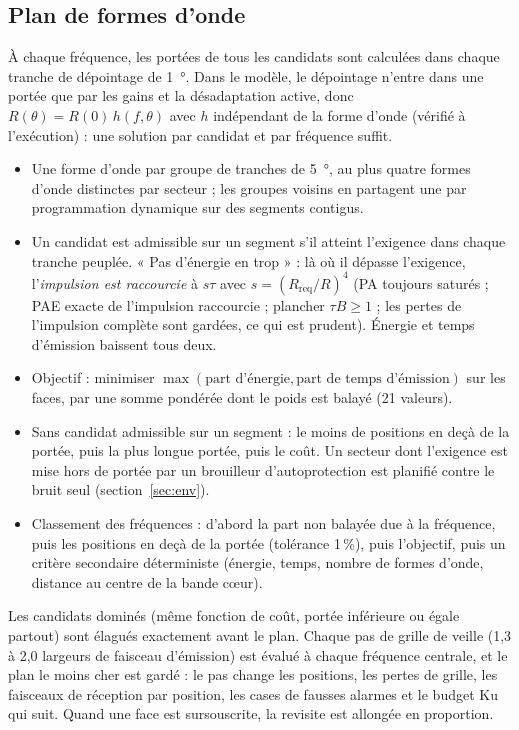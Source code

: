\documentclass[11pt,a4paper]{article}
\begin{document}
\subsection{Plan de formes d'onde}
À chaque fréquence, les portées de tous les candidats sont calculées dans chaque tranche de dépointage de
\SI{1}{\degree}. Dans le modèle, le dépointage n'entre dans une portée que par les gains et la désadaptation active,
donc $R(\theta) = R(0)\,h(f,\theta)$ avec $h$ indépendant de la forme d'onde (vérifié à l'exécution) : une solution par
candidat et par fréquence suffit.
\begin{itemize}
  \item Une forme d'onde par groupe de tranches de \SI{5}{\degree}, au plus quatre formes d'onde distinctes par
        secteur ; les groupes voisins en partagent une par programmation dynamique sur des segments contigus.
  \item Un candidat est admissible sur un segment s'il atteint l'exigence dans chaque tranche peuplée. « Pas
        d'énergie en trop » : là où il dépasse l'exigence, l'\emph{impulsion est raccourcie} à $s\tau$ avec
        $s = (R_{\mathrm{req}}/R)^4$ (PA toujours saturés ; PAE exacte de l'impulsion raccourcie ; plancher
        $\tau B \ge 1$ ; les pertes de l'impulsion complète sont gardées, ce qui est prudent). Énergie et temps
        d'émission baissent tous deux.
  \item Objectif : minimiser $\max(\text{part d'énergie}, \text{part de temps d'émission})$ sur les faces, par une
        somme pondérée dont le poids est balayé (21 valeurs).
  \item Sans candidat admissible sur un segment : le moins de positions en deçà de la portée, puis la plus longue
        portée, puis le coût. Un secteur dont l'exigence est mise hors de portée par un brouilleur d'autoprotection est
        planifié contre le bruit seul (section~\ref{sec:env}).
  \item Classement des fréquences : d'abord la part non balayée due à la fréquence, puis les positions en deçà de la
        portée (tolérance 1\,\%), puis l'objectif, puis un critère secondaire déterministe (énergie, temps, nombre de
        formes d'onde, distance au centre de la bande c\oe{}ur).
\end{itemize}
Les candidats dominés (même fonction de coût, portée inférieure ou égale partout) sont élagués exactement avant le
plan. Chaque pas de grille de veille (1,3 à 2,0 largeurs de faisceau d'émission) est évalué à chaque fréquence
centrale, et le plan le moins cher est gardé : le pas change les positions, les pertes de grille, les faisceaux de
réception par position, les cases de fausses alarmes et le budget Ku qui suit. Quand une face est sursouscrite, la
revisite est allongée en proportion.
\end{document}
